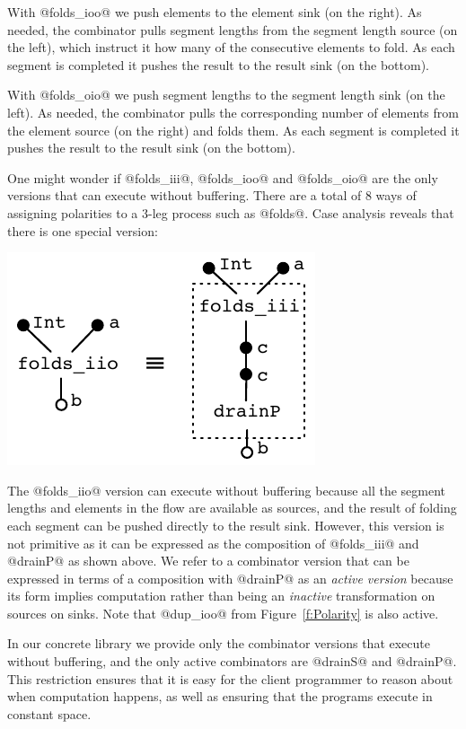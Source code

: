With @folds_ioo@ we push elements to the element sink (on the right). As needed, the combinator pulls segment lengths from the segment length source (on the left), which instruct it how many of the consecutive elements to fold. As each segment is completed it pushes the result to the result sink (on the bottom).

With @folds_oio@ we push segment lengths to the segment length sink (on the left). As needed, the combinator pulls the corresponding number of elements from the element source (on the right) and folds them. As each segment is completed it pushes the result to the result sink (on the bottom). 

One might wonder if @folds_iii@, @folds_ioo@ and @folds_oio@ are the only versions that can execute without buffering. There are a total of 8 ways of assigning polarities to a 3-leg process such as @folds@. Case analysis reveals that there is one special version:
\vspace{-1ex}
\begin{center}
\includegraphics[scale=0.8]{figures/folds-drain.pdf}
\end{center}

\vspace{-1ex}
The @folds_iio@ version can execute without buffering because all the segment lengths and elements in the flow are available as sources, and the result of folding each segment can be pushed directly to the result sink. However, this version is not primitive as it can be expressed as the composition of @folds_iii@ and @drainP@ as shown above. We refer to a combinator version that can be expressed in terms of a composition with @drainP@ as an \emph{active version} because its form implies computation rather than being an \emph{inactive} transformation on sources on sinks. Note that @dup_ioo@ from Figure~\ref{f:Polarity} is also active.

In our concrete library we provide only the combinator versions that execute without buffering, and the only active combinators are @drainS@ and @drainP@. This restriction ensures that it is easy for the client programmer to reason about when computation happens, as well as ensuring that the programs execute in constant space.


